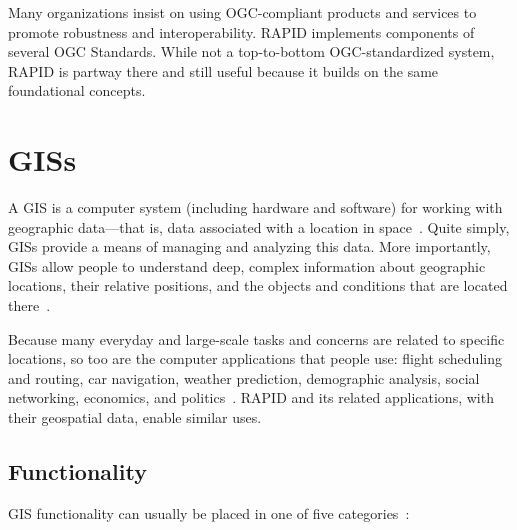 Many organizations insist on using OGC-compliant products and services to promote robustness and interoperability. RAPID implements components of several OGC Standards. While not a top-to-bottom OGC-standardized system, RAPID is partway there and still useful because it builds on the same foundational concepts.

\section{GISs}
A GIS is a computer system (including hardware and software) for working with geographic data---that is, data associated with a location in space~\cite{Esriintro}. Quite simply, GISs provide a means of managing and analyzing this data. More importantly, GISs allow people to understand deep, complex information about geographic locations, their relative positions, and the objects and conditions that are located there~\cite{Esriintro}.

Because many everyday and large-scale tasks and concerns are related to specific locations, so too are the computer applications that people use: flight scheduling and routing, car navigation, weather prediction, demographic analysis, social networking, economics, and politics~\cite{Esriintro}. RAPID and its related applications, with their geospatial data, enable similar uses.

\subsection{Functionality}
GIS functionality can usually be placed in one of five categories~\cite{Esriintro}:

